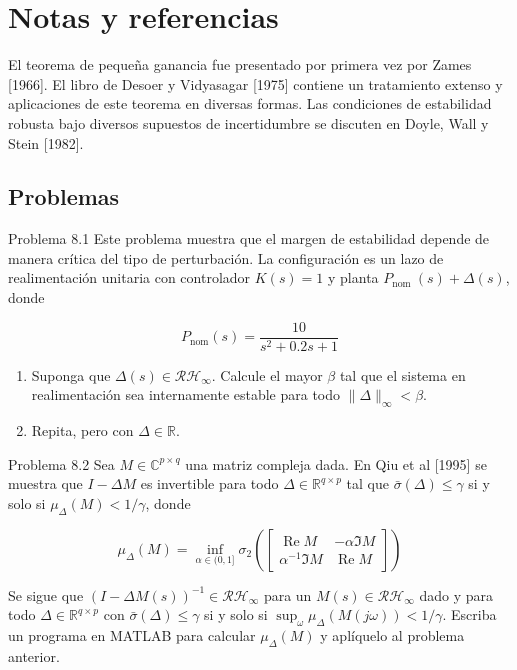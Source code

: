 \section{Notas y referencias}
El teorema de pequeña ganancia fue presentado por primera vez por Zames [1966]. El libro de Desoer y Vidyasagar [1975] contiene un tratamiento extenso y aplicaciones de este teorema en diversas formas. Las condiciones de estabilidad robusta bajo diversos supuestos de incertidumbre se discuten en Doyle, Wall y Stein [1982].


\subsection*{Problemas}
Problema 8.1 Este problema muestra que el margen de estabilidad depende de manera crítica del tipo de perturbación. La configuración es un lazo de realimentación unitaria con controlador $K(s)=1$ y planta $P_{\text {nom }}(s)+\Delta(s)$, donde

$$
P_{\mathrm{nom}}(s)=\frac{10}{s^{2}+0.2 s+1}
$$

\begin{enumerate}
  \item Suponga que $\Delta(s) \in \mathcal{R} \mathcal{H}_{\infty}$. Calcule el mayor $\beta$ tal que el sistema en realimentación sea internamente estable para todo $\|\Delta\|_{\infty}<\beta$.
  \item Repita, pero con $\Delta \in \mathbb{R}$.
\end{enumerate}

Problema 8.2 Sea $M \in \mathbb{C}^{p \times q}$ una matriz compleja dada. En Qiu et al [1995] se muestra que $I-\Delta M$ es invertible para todo $\Delta \in \mathbb{R}^{q \times p}$ tal que $\bar{\sigma}(\Delta) \leq \gamma$ si y solo si $\mu_{\Delta}(M)<1 / \gamma$, donde

$$
\mu_{\Delta}(M)=\inf _{\alpha \in(0,1]} \sigma_{2}\left(\left[\begin{array}{cc}
\operatorname{Re} M & -\alpha \Im M \\
\alpha^{-1} \Im M & \operatorname{Re} M
\end{array}\right]\right)
$$

Se sigue que $(I-\Delta M(s))^{-1} \in \mathcal{R} \mathcal{H}_{\infty}$ para un $M(s) \in \mathcal{R} \mathcal{H}_{\infty}$ dado y para todo $\Delta \in \mathbb{R}^{q \times p}$ con $\bar{\sigma}(\Delta) \leq \gamma$ si y solo si $\sup _{\omega} \mu_{\Delta}(M(j \omega))<1 / \gamma$. Escriba un programa en MATLAB para calcular $\mu_{\Delta}(M)$ y aplíquelo al problema anterior.

